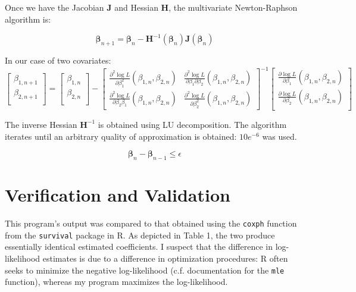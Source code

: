 \documentclass{article}
\begin{document}
Once we have the Jacobian $\bm{J}$ and Hessian $\bm{H}$, the multivariate
Newton-Raphson algorithm is:

\begin{equation}
	\bm{\beta}_{n+1} = \bm{\beta}_n -
	\bm{H}^{-1}(\bm{\beta}_n)\bm{J}(\bm{\beta}_n)
\end{equation}

In our case of two covariates:
\begin{equation}
	\begin{bmatrix}
		\beta_{1, n+1} \\
		\beta_{2, n+1} \\
	\end{bmatrix}
	=
	\begin{bmatrix}
		\beta_{1, n} \\
		\beta_{2, n} \\
	\end{bmatrix}
	-
	\begin{bmatrix}
		\frac{\partial^2 \log L}{\partial \beta_1^2}\left( \beta_{1,
		n}, \beta_{2, n} \right) &

		\frac{\partial^2 \log L}{\partial \beta_1 \partial \beta_2}\left( \beta_{1,
		n}, \beta_{2, n} \right) 
		
		\\

		\frac{\partial^2 \log L}{\partial \beta_2 \beta_1}\left( \beta_{1,
		n}, \beta_{2, n} \right) &

		\frac{\partial^2 \log L}{\partial \beta_2^2}\left( \beta_{1,
		n}, \beta_{2, n} \right) 
	\end{bmatrix}^{-1}
	\begin{bmatrix}
		\frac{\partial \log L}{\partial \beta_1}\left( \beta_{1, n},
		\beta_{2, n}\right) \\
		\frac{\partial \log L}{\partial \beta_2} \left( \beta_{1, n},
		\beta_{2, n} \right)\\
	\end{bmatrix}
\end{equation}

The inverse Hessian $\bm{H}^{-1}$ is obtained using LU decomposition. The algorithm 
iterates until an arbitrary quality of approximation is obtained: $10e^{-6}$ was
used.

\begin{equation}
	\bm{\beta}_{n} - \bm{\beta}_{n-1} \leq \epsilon
\end{equation}

\section*{Verification and Validation}
This program's output was compared to that obtained using
the \texttt{coxph} function from the \texttt{survival} package in R. As depicted
in Table 1, the two produce essentially identical estimated coefficients. I
 suspect that the difference in log-likelihood estimates is due to a
difference in optimization procedures: R often seeks to minimize the negative
log-likelihood (c.f. documentation for the \texttt{mle} function), 
whereas my program maximizes the log-likelihood. 
\end{document}
